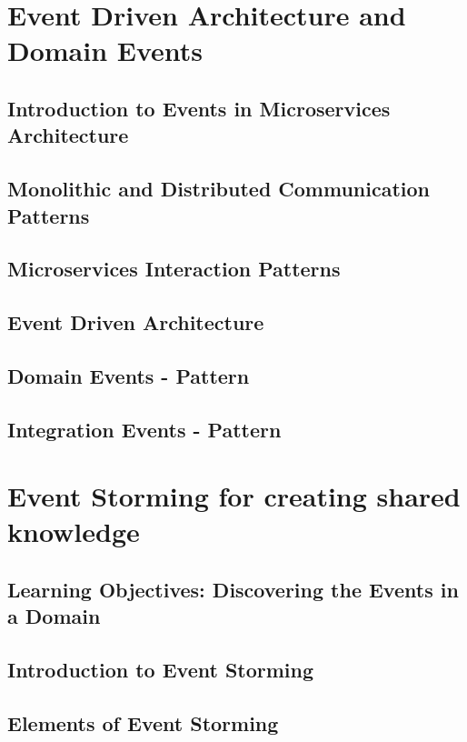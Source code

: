 \documentclass[a4paper, 11pt]{book}
\begin{document}
    \chapter{Event Driven Architecture and Domain Events}


    \section{Introduction to Events in Microservices Architecture}


    \section{Monolithic and Distributed Communication Patterns}


    \section{Microservices Interaction Patterns}


    \section{Event Driven Architecture}


    \section{Domain Events - Pattern}


    \section{Integration Events - Pattern}


    \chapter{Event Storming for creating shared knowledge}


    \section{Learning Objectives: Discovering the Events in a Domain}


    \section{Introduction to Event Storming}


    \section{Elements of Event Storming}
\end{document}

